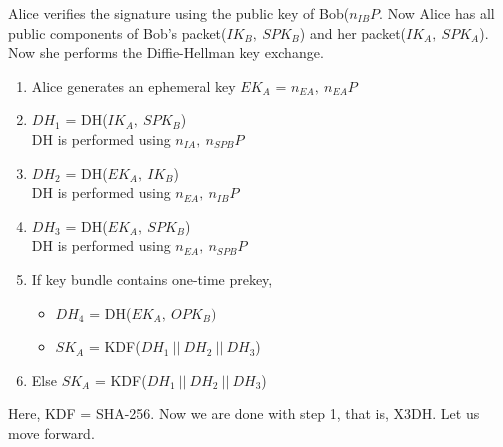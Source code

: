 \documentclass[11pt]{article}
\begin{document}
Alice verifies the signature using the public key of Bob($n_{IB}P$. Now Alice has all public components of Bob's packet(${IK}_B, \ {SPK}_B$) and her packet(${IK}_A, \ {SPK}_A$). Now she performs the Diffie-Hellman key exchange.
\begin{enumerate}
    \item Alice generates an ephemeral key ${EK}_A$ = $n_{EA}, \ n_{EA}P$
    \item ${DH}_1$ = DH(${IK}_A, \ {SPK}_B$)\\
    DH is performed using $n_{IA}, \ n_{SPB}P$
    \item ${DH}_2$ = DH(${EK}_A, \ {IK}_B$)\\
    DH is performed using $n_{EA}, \ n_{IB}P$
    \item ${DH}_3$ = DH(${EK}_A, \ {SPK}_B$)\\
    DH is performed using $n_{EA}, \ n_{SPB}P$
    \item If key bundle contains one-time prekey,
    \begin{itemize}
        \item ${DH}_4$ = DH(${EK}_A, \ {OPK}_B)$
        \item ${SK}_A$ = KDF(${DH}_1 \ || \ {DH}_2 \ || \  {DH}_3$)
    \end{itemize}
    \item Else ${SK}_A$ = KDF(${DH}_1 \ || \ {DH}_2 \ || \  {DH}_3$)
\end{enumerate}
Here, KDF = SHA-256.
\vspace{3mm}
Now we are done with step 1, that is, X3DH.
Let us move forward.
\end{document}
